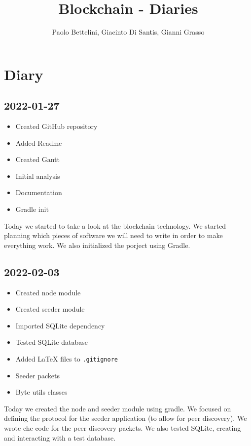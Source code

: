 \documentclass{article}
\title{Blockchain - Diaries}
\author{Paolo Bettelini, Giacinto Di Santis, Gianni Grasso}
\date{}
\begin{document}
\maketitle
\tableofcontents
\pagebreak

\section{Diary}

\subsection*{2022-01-27}

\begin{itemize}
    \item Created GitHub repository
    \item Added Readme
    \item Created Gantt
    \item Initial analysis
    \item Documentation
    \item Gradle init
\end{itemize}

Today we started to take a look at the blockchain technology.
We started planning which pieces of software we will need to write in order
to make everything work. We also initialized the porject using Gradle.

\subsection*{2022-02-03}

\begin{itemize}
    \item Created node module
    \item Created seeder module
    \item Imported SQLite dependency
    \item Tested SQLite database
    \item Added LaTeX files to \texttt{.gitignore}
    \item Seeder packets
    \item Byte utils classes
\end{itemize}

Today we created the node and seeder module using gradle.
We focused on defining the protocol for the seeder application
(to allow for peer discovery). We wrote che code for the peer discovery
packets. We also tested SQLite, creating and interacting with a test database.
\end{document}
